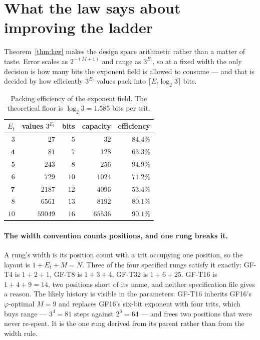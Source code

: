 \documentclass[11pt]{article}
\theoremstyle{definition}
\begin{document}
\section{What the law says about improving the ladder}\label{sec:design}

Theorem~\ref{thm:law} makes the design space arithmetic rather than a matter of
taste. Error scales as $2^{-(M+1)}$ and range as $3^{E_t}$, so at a fixed width
the only decision is how many bits the exponent field is allowed to consume ---
and that is decided by how efficiently $3^{E_t}$ values pack into
$\lceil E_t \log_2 3\rceil$ bits.

\begin{table}[t]\centering
\caption{Packing efficiency of the exponent field. The theoretical floor is
$\log_2 3 = 1.585$ bits per trit.}
\label{tab:pack}
\begin{tabular}{rrrrr}
\toprule
$E_t$ & values $3^{E_t}$ & bits & capacity & efficiency \\
\midrule
$3$  & $27$    & $5$  & $32$   & $84.4\%$ \\
$\mathbf{4}$  & $81$    & $7$  & $128$  & $\mathbf{63.3\%}$ \\
$5$  & $243$   & $8$  & $256$  & $\mathbf{94.9\%}$ \\
$6$  & $729$   & $10$ & $1024$ & $71.2\%$ \\
$\mathbf{7}$  & $2187$  & $12$ & $4096$ & $\mathbf{53.4\%}$ \\
$8$  & $6561$  & $13$ & $8192$ & $80.1\%$ \\
$10$ & $59049$ & $16$ & $65536$ & $90.1\%$ \\
\bottomrule
\end{tabular}
\end{table}

\paragraph{The width convention counts positions, and one rung breaks it.}
A rung's width is its position count with a trit occupying one position, so the
layout is $1 + E_t + M = N$. Three of the four specified rungs satisfy it exactly:
GF-T4 is $1+2+1$, GF-T8 is $1+3+4$, GF-T32 is $1+6+25$. GF-T16 is
$1+4+9 = 14$, two positions short of its name, and neither specification file
gives a reason. The likely history is visible in the parameters: GF-T16 inherits
GF16's $\varphi$-optimal $M = 9$ and replaces GF16's six-bit exponent with four
trits, which buys range --- $3^4 = 81$ steps against $2^6 = 64$ --- and frees two
positions that were never re-spent. It is the one rung derived from its parent
rather than from the width rule.
\end{document}
